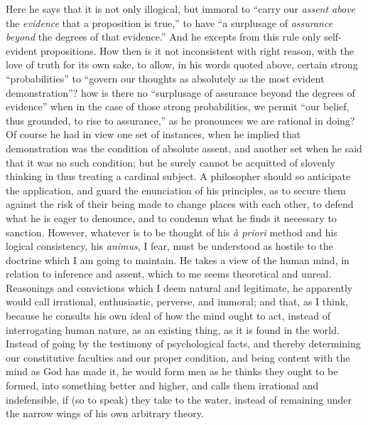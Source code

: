 Here he says that it is not only illogical, but immoral to
``carry our \emph{assent above} the \emph{evidence} that a
proposition is true,'' to have ``a surplusage of \emph{assurance
beyond} the degrees of that evidence.'' And he excepts from
this rule only self-evident propositions. How then is it not
inconsistent with right reason, with the love of truth for its own
sake, to allow, in his words quoted above, certain strong
``probabilities'' to ``govern our thoughts as absolutely
as the most evident demonstration''? how is there no ``surplusage
of assurance beyond the degrees of evidence'' when in the case of
those strong probabilities, we permit ``our belief, thus grounded,
to rise to assurance,'' as he pronounces we are rational in doing?
Of course he had in view one set of instances, when he implied
that demonstration was the condition of absolute assent, and another
set when he said that it was no such condition; but he surely cannot
be acquitted of slovenly thinking in thus treating a cardinal subject.
A philosopher should so anticipate the application, and guard the
enunciation of his principles, as to secure them against the risk of
their being made to change places with each other, to defend what he
is eager to denounce, and to condemn what he finds it necessary to
sanction. However, whatever is to be thought of his \emph{à priori}
method and his logical consistency, his \emph{animus}, I fear, must be
understood as hostile to the doctrine which I am going to maintain. He
takes a view of the human mind, in relation to inference and assent,
which to me seems theoretical and unreal. Reasonings and convictions
which I deem natural and legitimate, he apparently would call
irrational, enthusiastic, perverse, and immoral; and that, as I think,
because he consults his own ideal of how the mind ought to act,
instead of interrogating human nature, as an existing thing, as it is
found in the world. Instead of going by the testimony of psychological
facts, and thereby determining our constitutive faculties and our
proper condition, and being content with the mind as God has made it,
he would form men as he thinks they ought to be formed, into something
better and higher, and calls them irrational and indefensible, if (so
to speak) they take to the water, instead of remaining under the
narrow wings of his own arbitrary theory.

